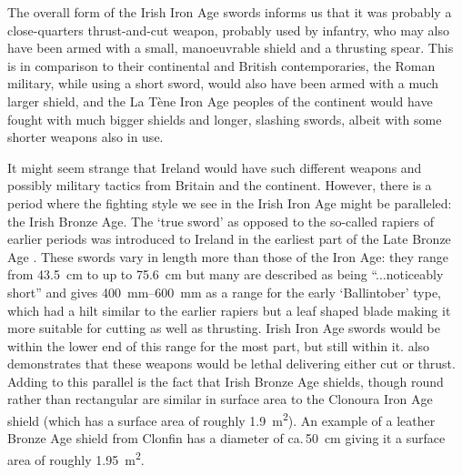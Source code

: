 The overall form of the Irish Iron Age swords informs us that it was probably a close-quarters thrust-and-cut weapon, probably used by infantry, who may also have been armed with a small, manoeuvrable shield and a thrusting spear. This is in comparison to their continental and British contemporaries, the Roman military, while using a short sword, would also have been armed with a much larger shield, and the La Tène Iron Age peoples of the continent would have fought with much bigger shields and longer, slashing swords, albeit with some shorter weapons also in use.

It might seem strange that Ireland would have such different weapons and possibly military tactics from Britain and the continent. 
However, there is a period where the fighting style we see in the Irish Iron Age might be paralleled: 
the Irish Bronze Age. The ‘true sword’ as opposed to the so-called rapiers of earlier periods was introduced to Ireland in the earliest part of the Late Bronze Age \parencite[132\psq]{Mallory2013}. These swords vary in length more than those of the Iron Age: they range from \SI{43.5}{\cm} to up to \SI{75.6}{\cm} but many are described as being “...noticeably short” \parencite[52]{Colquhoun2011} and \textcite[105]{Molloy2007} gives \SIrange{400}{600}{\mm} as a range for the early ‘Ballintober’ type, which had a hilt similar to the earlier rapiers but a leaf shaped blade making it more suitable for cutting as well as thrusting.
Irish Iron Age swords would be within the lower end of this range for the most part, but still within it. 
\textcite[105--107]{Molloy2007}  also demonstrates that these weapons would be lethal delivering either cut or thrust. 
Adding to this parallel is the fact that Irish Bronze Age shields,
 though round rather than rectangular are similar in surface area to the Clonoura Iron Age shield (which has a surface area of roughly \SI{1.9}{\meter\squared}). 
An example of a leather Bronze Age shield from Clonfin has a diameter of ca.\,\SI{50}{\cm} \parencite[25]{Osgood2001} giving it a surface area of roughly \SI{1.95}{\meter\squared}.

